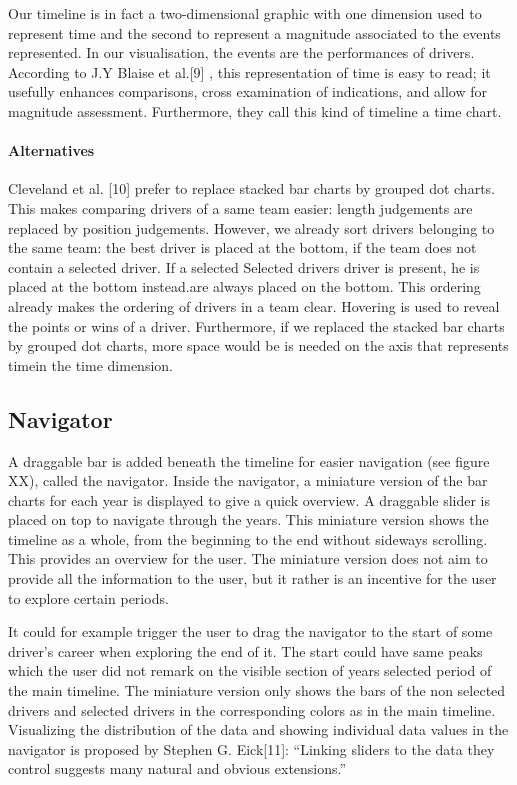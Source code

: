 \documentclass{sigchi}
\begin{document}
Our timeline is in fact a two-dimensional graphic with one dimension used to represent time and the second to represent a magnitude associated to the events represented. In our visualisation, the events are the performances of drivers. According to J.Y Blaise et al.[9] , this representation of time is easy to read; it usefully enhances comparisons, cross examination of indications, and allow for magnitude assessment.  Furthermore, they call this kind of timeline a time chart. 

\paragraph{Alternatives} %
\label{par:alternatives}
Cleveland et al.  [10] prefer to replace stacked bar charts by grouped dot charts. This makes comparing drivers of a same team easier: length judgements are replaced by position judgements. However, we already sort drivers belonging to the same team: the best driver is placed at the bottom, if the team does not contain a selected driver. If a selected Selected drivers driver is present, he is placed at the bottom instead.are always placed on the bottom. This ordering already makes the ordering of drivers in a team clear. Hovering is used to reveal the points or wins of a driver. Furthermore, if we replaced the stacked bar charts by grouped dot charts, more space would be is needed on the axis that represents timein the time dimension. 



\subsection{Navigator}

A draggable bar is added beneath the timeline for easier navigation (see figure XX), called the navigator. Inside the navigator, a miniature version of the bar charts for each year is displayed to give a quick overview. A draggable slider is placed on top to navigate through the years.
This miniature version shows the timeline as a whole, from the beginning to the end without sideways scrolling. This provides an overview for the user. The miniature version does not aim to provide all the information to the user, but it rather is an incentive for the user to explore certain periods. 

It could for example trigger the user to drag the navigator to the start of some driver’s career when exploring the end of it. The start could have same peaks which the user did not remark on the visible section of years selected period of the main timeline. The miniature version only shows the bars of the non selected drivers and selected drivers in the corresponding colors as in the main timeline. Visualizing the distribution of the data and showing individual data values in the navigator is proposed by Stephen G. Eick[11]: “Linking sliders to the data they control suggests many natural and obvious extensions.”
\end{document}
